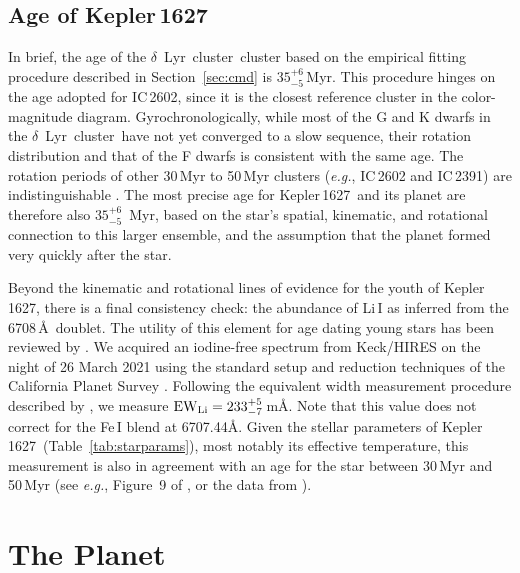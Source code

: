 \documentclass[12pt,modern,twocolumn,tighten]{aastex63}
\newcommand{\cn}{$\delta$\ Lyr\ cluster} %
\newcommand{\sn}{Kepler\,1627} %
\begin{document}
\subsection{Age of Kepler\,1627}

In brief, the age of the \cn\ cluster based on the empirical
fitting procedure described in Section~\ref{sec:cmd} is
$35^{+6}_{-5}$\,Myr.  This procedure hinges on the age adopted for
IC\,2602, since it is the closest reference cluster in the
color-magnitude diagram.  Gyrochronologically, while most of the G and
K dwarfs in the \cn\ have not yet converged to a slow sequence, their
rotation distribution and that of the F dwarfs is consistent with the
same age.  The rotation periods of other 30\,Myr to 50\,Myr clusters
({\it e.g.}, IC\,2602 and IC\,2391) are indistinguishable
\citep{douglas_stephanie_t_2021_5131306}.  The most precise age for \sn\ and its
planet are therefore also $35^{+6}_{-5}$\, Myr, based on the star's
spatial, kinematic, and rotational connection to this larger ensemble,
and the assumption that the planet formed very quickly after the star.

Beyond the kinematic and rotational lines of evidence for the youth of
\sn, there is a final consistency check: the abundance of
Li\,\textsc{I} as inferred from the 6708\,\AA\ doublet.  The utility
of this element for age dating young stars has been reviewed by
\citet{soderblom_ages_2014}.  We acquired an iodine-free spectrum from
Keck/HIRES on the night of 26 March 2021 using the standard setup and
reduction techniques of the California Planet Survey
\citep{howard_cps_2010}.  Following the equivalent width measurement
procedure described by \citet{bouma_2021_ngc2516}, we measure ${\rm
EW}_{\rm Li} = 233^{+5}_{-7}\,$m\AA.   Note that this value does not
correct for the Fe\,\textsc{I} blend at 6707.44\AA.  Given the stellar
parameters of \sn\ (Table~\ref{tab:starparams}), most notably its
effective temperature, this measurement is also in agreement with an
age for the star between 30\,Myr and 50\,Myr (see {\it e.g.}, Figure~9
of \citealt{bouma_2021_ngc2516}, or the data from
\citealt{randich_gaiaeso_2018}).


\section{The Planet}
\label{sec:planet}
\end{document}
